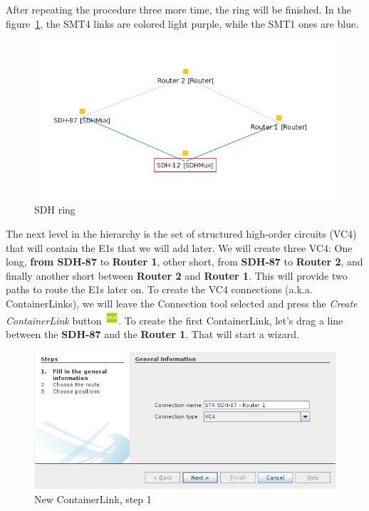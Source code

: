 \documentclass[a4paper]{article}
\begin{document}
		After repeating the procedure three more time, the ring will be finished. In the figure~\ref{fig:sdh_module_ring}, the SMT4 links are colored light purple, while the SMT1 ones are blue.
		\begin{figure}[h!]
			\centering
			\includegraphics[width=0.7\linewidth]{img/sdh_module_ring.png}
			\caption{SDH ring}
			\label{fig:sdh_module_ring}
		\end{figure}
		\newpage
		The next level in the hierarchy is the set of structured high-order circuits (VC4) that will contain the E1s that we will add later. We will create three VC4: One long, \textbf{from SDH-87} to \textbf{Router 1}, other short, from \textbf{SDH-87} to \textbf{Router 2}, and finally another short between \textbf{Router 2} and \textbf{Router 1}. This will provide two paths to route the E1s later on. To create the VC4 connections (a.k.a. ContainerLinks), we will leave the Connection tool selected and press the \textit{Create ContainerLink} button \includegraphics[width=0.5cm]{img/sdh_module_container_link.png}. To create the first ContainerLink, let's drag a line between the \textbf{SDH-87} and the \textbf{Router 1}. That will start a wizard.
		\begin{figure}[h!]
			\centering
			\includegraphics[width=\linewidth]{img/sdh_module_container_link_step_1.png}
			\caption{New ContainerLink, step 1}
			\label{fig:sdh_module_container_link_step_1}
		\end{figure}
		
\end{document}
